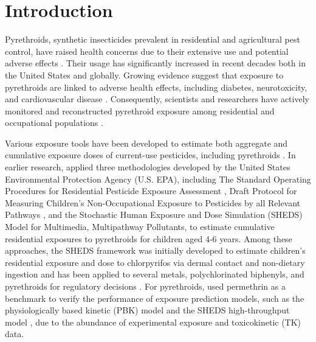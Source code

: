 \documentclass[toxics,article,submit,pdftex,moreauthors]{Definitions/mdpi}
\begin{document}
\section{Introduction}\label{introduction}

Pyrethroids, synthetic insecticides prevalent in residential and agricultural
pest control, have raised health concerns due to their extensive use and
potential adverse effects \citep{burns2018pyrethroid}. Their usage has
significantly increased in recent decades both in the United States and
globally. Growing evidence suggest that exposure to pyrethroids are linked to
adverse health effects, including diabetes, neurotoxicity, and cardiovascular
disease \citep{park2019environmental, bao2020association,
kim2021environmental}. Consequently, scientists and researchers have actively
monitored and reconstructed pyrethroid exposure among residential and
occupational populations \citep{zartarian2012quantifying,
bravo2022occupational}.

Various exposure tools have been developed to estimate both aggregate
and cumulative exposure doses of current-use pesticides, including
pyrethroids
\citep{tulve2011methodologies, zartarian2012quantifying, xue2014epa}. In
earlier research, \citet{tulve2011methodologies} applied three methodologies
developed by the United States Environmental Protection Agency (U.S. EPA),
including The Standard Operating Procedures for Residential Pesticide Exposure
Assessment \citep{us2012standard}, Draft Protocol for Measuring Children's
Non-Occupational Exposure to Pesticides by all Relevant Pathways
\citep{us2001draft}, and the Stochastic Human Exposure and Dose Simulation
(SHEDS) Model for Multimedia, Multipathway Pollutants, to estimate cumulative
residential exposures to pyrethroids for children aged 4-6 years. Among these
approaches, the SHEDS framework was initially developed to estimate children's
residential exposure and dose to chlorpyrifos via dermal contact and
non-dietary ingestion \citep{zartarian2000modeling} and has been applied to
several metals, polychlorinated biphenyls, and pyrethroids for regulatory
decisions \citep{tulve2011methodologies, xue2015modeling,
zartarian2017children}. For pyrethroids, \citet{zartarian2012quantifying} used
permethrin as a benchmark to verify the performance of exposure prediction
models, such as the physiologically based kinetic (PBK) model
\citep{tornero2012pharmacokinetic} and the SHEDS high-throughput model
\citep{isaacs2014sheds}, due to the abundance of experimental exposure and
toxicokinetic (TK) data.
\end{document}
